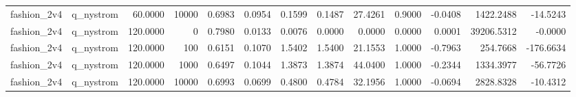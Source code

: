\begin{table}
\begin{tabular}{llrrrrrrrrrrr}
fashion\_2v4 & q\_nystrom & 60.0000 & 10000 & 0.6983 & 0.0954 & 0.1599 & 0.1487 & 27.4261 & 0.9000 & -0.0408 & 1422.2488 & -14.5243 \\
fashion\_2v4 & q\_nystrom & 120.0000 & 0 & 0.7980 & 0.0133 & 0.0076 & 0.0000 & 0.0000 & 0.0000 & 0.0001 & 39206.5312 & -0.0000 \\
fashion\_2v4 & q\_nystrom & 120.0000 & 100 & 0.6151 & 0.1070 & 1.5402 & 1.5400 & 21.1553 & 1.0000 & -0.7963 & 254.7668 & -176.6634 \\
fashion\_2v4 & q\_nystrom & 120.0000 & 1000 & 0.6497 & 0.1044 & 1.3873 & 1.3874 & 44.0400 & 1.0000 & -0.2344 & 1334.3977 & -56.7726 \\
fashion\_2v4 & q\_nystrom & 120.0000 & 10000 & 0.6993 & 0.0699 & 0.4800 & 0.4784 & 32.1956 & 1.0000 & -0.0694 & 2828.8328 & -10.4312 \\
\bottomrule
\end{tabular}
\end{table}
